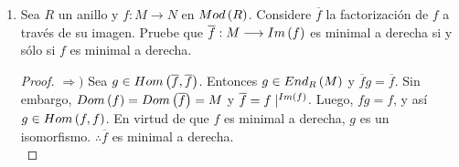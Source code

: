 \documentclass{article}
\begin{document}
\begin{enumerate}[label=\textbf{Ej \arabic*.}]
\begin{proof}
			 Supongamos que $S$, con $\circ$ como producto, es una $R$-álgebra por medio del morfismo $\varphi$. Entonces necesariamente $\exists$  $+$ operación en $S$ tal que $S:=\lrprth{End_{\mathcal{C}}\lrbrack{*},+,\circ}$ es un anillo y, por el Ej. 3, $\varphi$ induce una acción compatible del anillo conmutativo $R$ en $S$, $\bullet_\varphi$. Notemos que las propiedades de las acciones compatibles garantizan que por medio de $\bullet_\varphi$ $S\in Mod\lrprth{R}$ y que, si $r\in R$ y $f,g,h\in S$
			\begin{align*}
				\lrprth{r\bullet_\varphi f+g}\circ h&=\lrprth{r\bullet_\varphi f}\circ h+g\circ h=r\bullet_\varphi\lrprth{f\circ h}+ g\circ h,\\
				f\circ\lrprth{r\bullet_\varphi g+ h}&=f\circ\lrprth{r\bullet_\varphi g}+ f\circ h=r\bullet_\varphi\lrprth{f\circ h}+ f\circ h.
			\end{align*}
			Con lo cual se satisfacen las condiciones i) y ii) enunciadas en la demostración de la necesidad, y por lo tanto $\mathcal{C}$ es una $R$-categoría.
			\begin{obs}
				Notemos que tanto en la necesidad como en la suficiencia de lo previamente demostrado $S$ posee una estructura de anillo, por medio de la cual puede obtener una estructura natural de $S$-módulo. Más aún, por el Ej. 5, la estructura que posee $S$ cómo $R$-módulo  coincide con aquella que se puede obtener aplicando un cambio de anillos $\gamma:R\to S$ a $\ringmod{S}{S}{l}$  ($\gamma=\varphi_\bullet$ en la necesidad y $\gamma=\varphi$ en la suficiencia).
			\end{obs}
			 Como $R$ es artiniano, por el Teorema 2.7.15$a)$ se tiene que
			\begin{align*}
				S\in f.l.\lrprth{R}\iff S&\in mod\lrprth{R}.
			\end{align*}
			De lo anterior, el inciso $a)$ y la Observación, se tiene lo deseado.\\			
		\end{proof}
		\item Sea $R$ un anillo y $f:M \longrightarrow N$ en $Mod\left(R\right)$. Considere $\overline{f}$ la factorización de $f$ a través de su imagen. Pruebe que $\overline{f}:M \longrightarrow Im\left(f\right)$ es minimal a derecha si y sólo si $f$ es minimal a derecha.
		\begin{proof}
			$\boxed{\Rightarrow )}$ Sea $g \in Hom\left(\overline{f},\overline{f}\right)$. Entonces $g \in End_{R}\left(M\right)$ y $\overline{f}g=\overline{f}$. Sin embargo, $Dom\left(f\right)=Dom\left(\overline{f}\right)=M$ y $\overline{f}=f\mid^{Im\left(f\right)}$. Luego, $fg=f$, y así $g \in Hom\left(f,f\right)$. En virtud de que $f$ es minimal a derecha, $g$ es un isomorfismo. $\therefore\overline{f}$ es minimal a derecha.\\
			

\end{proof}
\end{enumerate}
\end{document}

